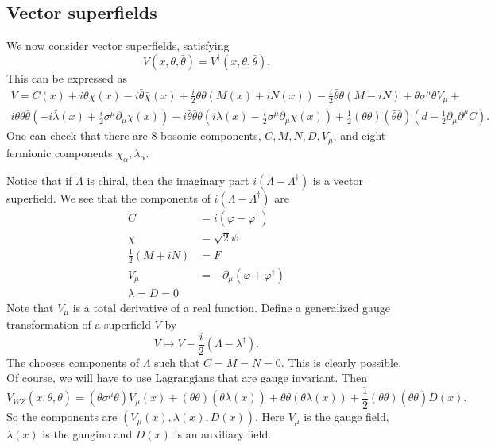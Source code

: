 \documentclass[a4paper]{article}
\begin{document}
\subsection{Vector superfields}
We now consider vector superfields, satisfying
\[
  V(x, \theta, \bar{\theta}) = V^\dagger (x, \theta, \bar{\theta}).
\]
This can be expressed as
\begin{multline*}
  V = C(x) + i \theta \chi(x) - i \bar{\theta} \bar{\chi}(x) + \frac{i}{2} \theta \theta (M(x) + i N(x)) - \frac{i}{2} \bar{\theta} \theta (M - iN) + \theta \sigma^\mu \theta V_\mu +\\
  i \theta \theta \bar{\theta} \left(-i \bar{\lambda}(x) + \frac{i}{2} \bar{\sigma}^\mu \partial_\mu \chi(x)\right) - i \bar{\theta} \bar{\theta} \theta \left(i \lambda(x) - \frac{i}{2} \sigma^\mu \partial_\mu \bar{\chi}(x)\right) + \frac{1}{2} (\theta \theta)(\bar{\theta} \bar{\theta}) \left(d - \frac{1}{2} \partial_\mu \partial^\mu C\right).
\end{multline*}
One can check that there are 8 bosonic components, $C, M , N, D, V_\mu$, and eight fermionic components $\chi_\alpha, \lambda_\alpha$.

Notice that if $\Lambda$ is chiral, then the imaginary part $i(\Lambda - \Lambda^\dagger)$ is a vector superfield. We see that the components of $i(\Lambda - \Lambda^\dagger)$ are
\begin{align*}
  C &= i (\varphi - \varphi^\dagger)\\
  \chi &= \sqrt{2} \psi\\
  \frac{1}{2} (M + i N) &= F\\
  V_\mu &= - \partial_\mu (\varphi + \varphi^\dagger)\\
  \lambda = D = 0
\end{align*}
Note that $V_\mu$ is a total derivative of a real function. Define a generalized gauge transformation of a superfield $V$ by
\[
  V \mapsto V - \frac{i}{2} (\Lambda - \lambda^\dagger).
\]
The  chooses components of $\Lambda$ such that $C = M = N = 0$. This is clearly possible. Of course, we will have to use Lagrangians that are gauge invariant. Then
\[
  V_{WZ} (x, \theta, \bar{\theta}) = (\theta \sigma^\mu \bar{\theta}) V_\mu(x) + (\theta\theta)(\bar{\theta} \bar{\lambda}(x)) + \bar{\theta} \bar{\theta} (\theta\lambda(x)) + \frac{1}{2} (\theta\theta)(\bar{\theta}\bar{\theta}) D(x).
\]
So the components are $(V_\mu(x), \lambda(x), D(x))$. Here $V_\mu$ is the gauge field, $\lambda(x)$ is the gaugino and $D(x)$ is an auxiliary field.
\end{document}

